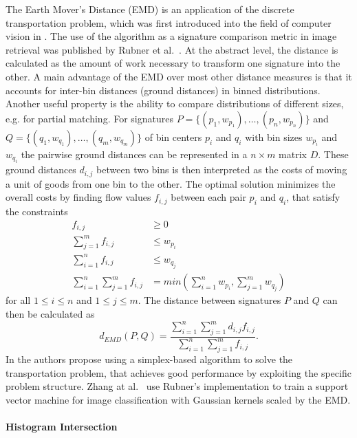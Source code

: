 The Earth Mover's Distance (EMD) is an application of the discrete
transportation problem, which was first introduced into the field of computer
vision in \autocite{peleg_unified_1989}. The use of the algorithm as a signature
comparison metric in image retrieval was published by Rubner et al.\
\autocite{rubner_metric_1998}. At the abstract level, the distance is calculated
as the amount of work necessary to transform one signature into the other.
A main advantage of the EMD over most other distance measures is that it
accounts for inter-bin distances (ground distances) in binned distributions.
Another useful property is the ability to compare distributions of different
sizes, e.g. for partial matching.
For signatures $P = \{ (p_1, w_{p_1}), \dots, (p_n, w_{p_n}) \}$ and $Q = \{
(q_1, w_{q_1}), \dots, (q_m, w_{q_m}) \}$ of bin centers $p_i$ and $q_i$ with
bin sizes $w_{p_i}$ and $w_{q_i}$ the pairwise ground distances can be
represented in a $n \times m$ matrix $D$.
These ground distances $d_{i, j}$ between two bins is then interpreted as the
costs of moving a unit of goods from one bin to the other. The optimal solution
minimizes the overall costs by finding flow values $f_{i, j}$ between each pair
$p_i$ and $q_i$, that satisfy the constraints
\begin{align*}
    f_{i, j} & \geq 0 \\
    \sum_{j=1}^m f_{i, j} & \leq w_{p_i} \\
    \sum_{i=1}^n f_{i, j} & \leq w_{q_j} \\
    \sum_{i=1}^n \sum_{j=1}^m f_{i, j} & = min \left( \sum_{i=1}^n w_{p_i}, \sum_{j=1}^m w_{q_j} \right)
\end{align*}
for all $1 \leq i \leq n$ and $1 \leq j \leq m$.
The distance between signatures $P$ and $Q$ can then be calculated as
\begin{equation*}
    d_{EMD}(P, Q) = \frac{\sum_{i=1}^n \sum_{j=1}^m d_{i, j} f_{i, j}}{\sum_{i=1}^n \sum_{j=1}^m f_{i, j}}.
\end{equation*}
In \autocite{rubner_metric_1998} the authors propose using a simplex-based
algorithm to solve the transportation problem, that achieves good performance
by exploiting the specific problem structure. Zhang at al.\
\autocite{zhang_local_2006} use Rubner's implementation to train a support
vector machine for image classification with Gaussian kernels scaled by the
EMD.

\paragraph{Histogram Intersection}

